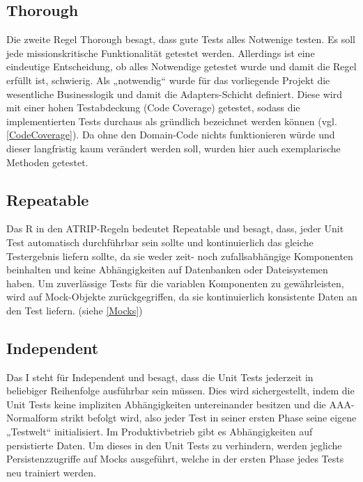\subsection{Thorough}
Die zweite Regel Thorough besagt, dass gute Tests alles Notwenige testen. Es soll jede missionskritische Funktionalität getestet werden. Allerdings ist eine eindeutige Entscheidung, ob alles Notwendige getestet wurde und damit die Regel erfüllt ist, schwierig. Als „notwendig“ wurde für das vorliegende Projekt die wesentliche Businesslogik und damit die Adapters-Schicht definiert. Diese wird mit einer hohen Testabdeckung (Code Coverage) getestet, sodass die implementierten Tests durchaus als gründlich bezeichnet werden können (vgl. \autoref{CodeCoverage}). Da ohne den Domain-Code nichts funktionieren würde und dieser langfristig kaum verändert werden soll, wurden hier auch exemplarische Methoden getestet.

\subsection{Repeatable}
Das R in den ATRIP-Regeln bedeutet Repeatable und besagt, dass, jeder Unit Test automatisch durchführbar sein sollte und kontinuierlich das gleiche Testergebnis liefern sollte, da sie weder zeit- noch zufallsabhängige Komponenten beinhalten und keine Abhängigkeiten auf Datenbanken oder Dateisystemen haben. Um zuverlässige Tests für die variablen Komponenten zu gewährleisten, wird auf Mock-Objekte zurückgegriffen, da sie kontinuierlich konsistente Daten an den Test liefern. (siehe \autoref{Mocks})


\subsection{Independent}
Das I steht für Independent und besagt, dass die Unit Tests jederzeit in beliebiger Reihenfolge ausführbar sein müssen. Dies wird sichergestellt, indem die Unit Tests keine impliziten Abhängigkeiten untereinander besitzen und die AAA-Normalform strikt befolgt wird, also jeder Test in seiner ersten Phase seine eigene „Testwelt“ initialisiert. Im Produktivbetrieb gibt es Abhängigkeiten auf persistierte Daten. Um dieses in den Unit Tests zu verhindern, werden jegliche Persistenzzugriffe auf Mocks ausgeführt, welche in der ersten Phase jedes Tests neu trainiert werden.

